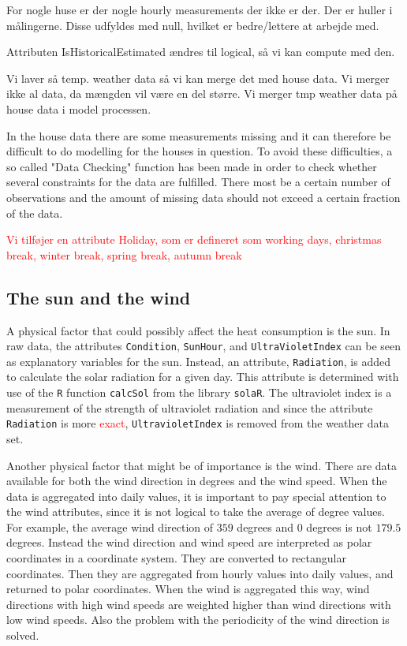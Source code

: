 For nogle huse er der nogle hourly measurements der ikke er der. Der er huller i målingerne. Disse udfyldes med null, hvilket er bedre/lettere at arbejde med. 


Attributen IsHistoricalEstimated ændres til logical, så vi kan compute med den. 

Vi laver så temp. weather data så vi kan merge det med house data. 
Vi merger ikke al data, da mængden vil være en del større. Vi merger tmp weather data på house data i model processen. 

In the house data there are some measurements missing and it can therefore be difficult to do modelling for the houses in question. To avoid these difficulties, a so called "Data Checking" function has been made in order to check whether several constraints for the data are fulfilled. There most be a certain number of observations and the amount of missing data should not exceed a certain fraction of the data. 

\noindent \textcolor{red}{Vi tilføjer en attribute Holiday, som er defineret som working days, christmas break, winter break, spring break, autumn break} \\

\subsection{The sun and the wind}
\noindent A physical factor that could possibly affect the heat consumption is the sun. In raw data, the attributes \texttt{Condition}, \texttt{SunHour},  and \texttt{UltraVioletIndex} can be seen as explanatory variables for the sun. Instead, an attribute, \texttt{Radiation}, is added to calculate the solar radiation for a given day. This attribute is determined with use of the \texttt{R} function \texttt{calcSol} from the library \texttt{solaR}. The ultraviolet index is a measurement of the strength of ultraviolet radiation and since the attribute \texttt{Radiation} is more \textcolor{red}{exact}, \texttt{UltravioletIndex} is removed from the weather data set. 

Another physical factor that might be of importance is the wind. There are data available for both the wind direction in degrees and the wind speed. When the data is aggregated into daily values, it is important to pay special attention to the wind attributes, since it is not logical to take the average of degree values. For example, the average wind direction of $359$ degrees and $0$ degrees is not $179.5$ degrees. Instead the wind direction and wind speed are interpreted as polar coordinates in a coordinate system. They are converted to rectangular coordinates. Then they are aggregated from hourly values into daily values, and returned to polar coordinates.  When the wind is aggregated this way, wind directions with high wind speeds are weighted higher than wind directions with low wind speeds. Also the problem with the periodicity of the wind direction is solved.
